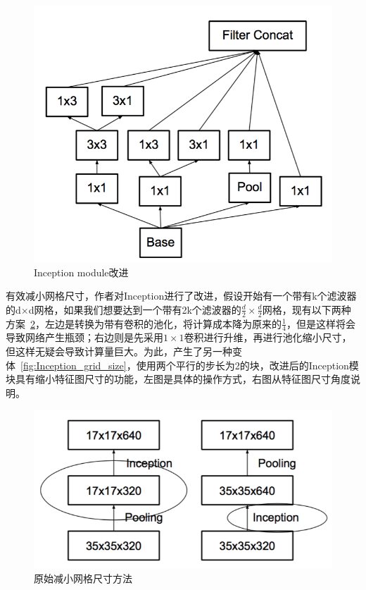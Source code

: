 \begin{figure}[htbp]
	\centering
	\includegraphics[width=\linewidth]{readings_figures/Inception_module_with_expand.png}
	\caption{Inception module改进}
	\label{fig:Inception_module_with_expand}
\end{figure}

有效减小网格尺寸，作者对Inception进行了改进，假设开始有一个带有k个滤波器的d×d网格，如果我们想要达到一个带有2k个滤波器的$\frac{d}{2}\times\frac{d}{2}$网格，现有以下两种方案~\ref{fig:Origin_grid_size}，左边是转换为带有卷积的池化，将计算成本降为原来的$\frac{1}{4}$，但是这样将会导致网络产生瓶颈；右边则是先采用$1\times1$卷积进行升维，再进行池化缩小尺寸，但这样无疑会导致计算量巨大。为此，产生了另一种变体~\ref{fig:Inception_grid_size}，使用两个平行的步长为2的块，改进后的Inception模块具有缩小特征图尺寸的功能，左图是具体的操作方式，右图从特征图尺寸角度说明。

\begin{figure}[htbp]
	\centering
	\includegraphics[width=\linewidth]{readings_figures/Origin_grid_size.png}
	\caption{原始减小网格尺寸方法}
	\label{fig:Origin_grid_size}
\end{figure}

